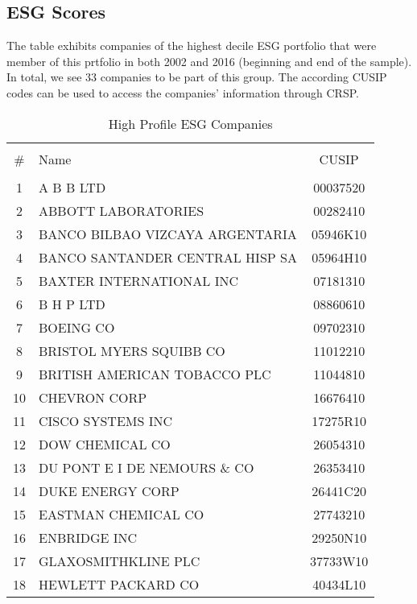 \documentclass[11pt]{article}
\newcommand\fnote[1]{\captionsetup{font=small}\caption*{#1}}
\begin{document}
\newpage
\begin{appendices}


\section{ESG Scores}
\label{app:esgscores}




\begin{table}[!htbp] \centering 
	\caption{High Profile ESG Companies} 
	\fnote{The table exhibits companies of the highest decile ESG portfolio that were member of this prtfolio in both 2002 and 2016 (beginning and end of the sample). In total, we see 33 companies to be part of this group. The according CUSIP codes can be used to access the companies' information through CRSP.}
	\label{tab:high_esg_companies} 
	\begin{tabular}{@{\extracolsep{5pt}} clc} 
		\\[-1.8ex]\hline 
		\hline \\[-1.8ex] 
		\# & Name & CUSIP \\ 
		\hline \\[-1.8ex] 
		1 & A B B LTD & 00037520 \\ 
		2 & ABBOTT LABORATORIES & 00282410 \\ 
		3 & BANCO BILBAO VIZCAYA ARGENTARIA & 05946K10 \\ 
		4 & BANCO SANTANDER CENTRAL HISP SA & 05964H10 \\ 
		5 & BAXTER INTERNATIONAL INC & 07181310 \\ 
		6 & B H P LTD & 08860610 \\ 
		7 & BOEING CO & 09702310 \\ 
		8 & BRISTOL MYERS SQUIBB CO & 11012210 \\ 
		9 & BRITISH AMERICAN TOBACCO PLC & 11044810 \\ 
		10 & CHEVRON CORP & 16676410 \\ 
		11 & CISCO SYSTEMS INC & 17275R10 \\ 
		12 & DOW CHEMICAL CO & 26054310 \\ 
		13 & DU PONT E I DE NEMOURS \& CO & 26353410 \\ 
		14 & DUKE ENERGY CORP & 26441C20 \\ 
		15 & EASTMAN CHEMICAL CO & 27743210 \\ 
		16 & ENBRIDGE INC & 29250N10 \\ 
		17 & GLAXOSMITHKLINE PLC & 37733W10 \\ 
		18 & HEWLETT PACKARD CO & 40434L10 \\ 

\end{tabular}
\end{table}
\end{appendices}
\end{document}

